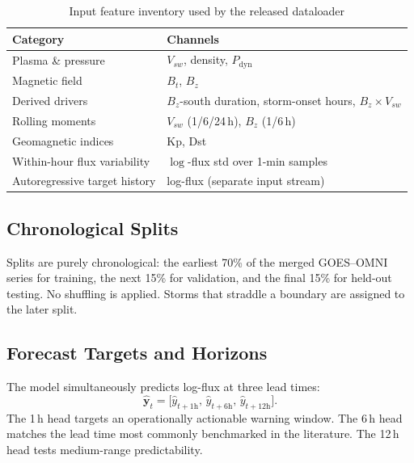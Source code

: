 \documentclass{ieeeaccess}
\begin{document}
\begin{table}[h]
\centering
\caption{Input feature inventory used by the released dataloader}
\label{tab:features}
\begin{tabular}{@{}ll@{}}
\toprule
\textbf{Category} & \textbf{Channels} \\ \midrule
Plasma \& pressure & \(V_{sw}\), density, \(P_{\mathrm{dyn}}\) \\
Magnetic field & \(B_t\), \(B_z\) \\
Derived drivers & \(B_z\)-south duration, storm-onset hours, \(B_z\times V_{sw}\) \\
Rolling moments & \(V_{sw}\) (1/6/24\,h), \(B_z\) (1/6\,h) \\
Geomagnetic indices & Kp, Dst \\
Within-hour flux variability & \(\log\)-flux std over 1-min samples \\
Autoregressive target history & log-flux (separate input stream) \\ \bottomrule
\end{tabular}
\end{table}

\subsection{Chronological Splits}
Splits are purely chronological: the earliest 70\% of the merged GOES--OMNI series
for training, the next 15\% for validation, and the final 15\% for held-out
testing. No shuffling is applied. Storms that straddle a boundary are assigned
to the later split.

\subsection{Forecast Targets and Horizons}
The model simultaneously predicts log-flux at three lead times:
\begin{equation}
\hat{\mathbf{y}}_{t}
=
\bigl[\hat{y}_{t+1\mathrm{h}},\,
\hat{y}_{t+6\mathrm{h}},\,
\hat{y}_{t+12\mathrm{h}}\bigr].
\label{eq:horizons}
\end{equation}
The 1\,h head targets an operationally actionable warning window.
The 6\,h head matches the lead time most commonly benchmarked in the literature.
The 12\,h head tests medium-range predictability.
\end{document}
